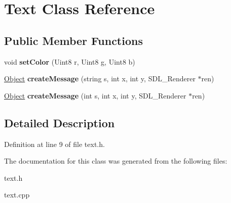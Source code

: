 \hypertarget{classText}{}\section{Text Class Reference}
\label{classText}
\subsection*{Public Member Functions}
\begin{DoxyCompactItemize}
\item 
void {\bfseries set\+Color} (Uint8 r, Uint8 g, Uint8 b)\hypertarget{classText_a1f55e875b7db8abfb4cbc4825fd5104d}{}\label{classText_a1f55e875b7db8abfb4cbc4825fd5104d}

\item 
\hyperlink{classObject}{Object} {\bfseries create\+Message} (string s, int x, int y, S\+D\+L\+\_\+\+Renderer $\ast$ren)\hypertarget{classText_af903be64b253bebaf4d18d423375a0c6}{}\label{classText_af903be64b253bebaf4d18d423375a0c6}

\item 
\hyperlink{classObject}{Object} {\bfseries create\+Message} (int s, int x, int y, S\+D\+L\+\_\+\+Renderer $\ast$ren)\hypertarget{classText_a8b02e19151ce433d5ea65f07a995bd76}{}\label{classText_a8b02e19151ce433d5ea65f07a995bd76}

\end{DoxyCompactItemize}


\subsection{Detailed Description}


Definition at line 9 of file text.\+h.



The documentation for this class was generated from the following files\+:\begin{DoxyCompactItemize}
\item 
text.\+h\item 
text.\+cpp\end{DoxyCompactItemize}
